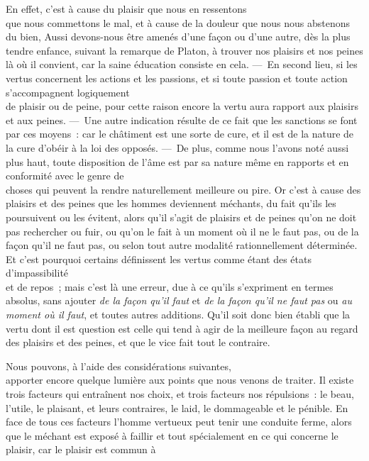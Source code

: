 \documentclass[french,twoside]{book} %
\begin{document}
En effet, c’est à cause du plaisir que nous en ressentons \\
que nous commettons le mal, et à cause de la douleur que nous nous abstenons du bien, Aussi devons-nous être amenés d’une façon ou d’une autre, dès la plus tendre enfance, suivant la remarque de Platon, à trouver nos plaisirs et nos peines là où il convient, car la saine éducation consiste en cela. — En second lieu, si les vertus concernent les actions et les passions, et si toute passion et toute action s’accompagnent logiquement \\
de plaisir ou de peine, pour cette raison encore la vertu aura rapport aux plaisirs et aux peines. — Une autre indication résulte de ce fait que les sanctions se font par ces moyens : car le châtiment est une sorte de cure, et il est de la nature de la cure d’obéir à la loi des opposés. — De plus, comme nous l’avons noté aussi plus haut, toute disposition de l’âme est par sa nature même en rapports et en conformité avec le genre de \\
choses qui peuvent la rendre naturellement meilleure ou pire. Or c’est à cause des plaisirs et des peines que les hommes deviennent méchants, du fait qu’ils les poursuivent ou les évitent, alors qu’il s’agit de plaisirs et de peines qu’on ne doit pas rechercher ou fuir, ou qu’on le fait à un moment où il ne le faut pas, ou de la façon qu’il ne faut pas, ou selon tout autre modalité rationnellement déterminée. Et c’est pourquoi certains définissent les vertus comme étant des états d’impassibilité \\
et de repos ; mais c’est là une erreur, due à ce qu’ils s’expriment en termes absolus, sans ajouter {\itshape de la façon qu’il faut} et {\itshape de la façon qu’il ne faut pas} ou {\itshape au moment où il faut}, et toutes autres additions. Qu’il soit donc bien établi que la vertu dont il est question est celle qui tend à agir de la meilleure façon au regard des plaisirs et des peines, et que le vice fait tout le contraire.\par
Nous pouvons, à l’aide des considérations suivantes, \\
apporter encore quelque lumière aux points que nous venons de traiter. Il existe trois facteurs qui entraînent nos choix, et trois facteurs nos répulsions : le beau, l’utile, le plaisant, et leurs contraires, le laid, le dommageable et le pénible. En face de tous ces facteurs l’homme vertueux peut tenir une conduite ferme, alors que le méchant est exposé à faillir et tout spécialement en ce qui concerne le plaisir, car le plaisir est commun à \\
\end{document}
